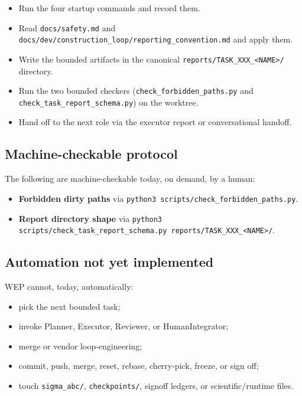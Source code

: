 \documentclass[11pt,a4paper]{article}
\begin{document}
\begin{itemize}[leftmargin=2em]
  \item Run the four startup commands and record them.
  \item Read \texttt{docs/safety.md} and
        \texttt{docs/dev/construction\_loop/reporting\_convention.md}
        and apply them.
  \item Write the bounded artifacts in the canonical
        \texttt{reports/TASK\_XXX\_<NAME>/} directory.
  \item Run the two bounded checkers
        (\texttt{check\_forbidden\_paths.py} and
        \texttt{check\_task\_report\_schema.py}) on the worktree.
  \item Hand off to the next role via the executor report or
        conversational handoff.
\end{itemize}

\subsection{Machine-checkable protocol}

The following are machine-checkable today, on demand, by a human:

\begin{itemize}[leftmargin=2em]
  \item \textbf{Forbidden dirty paths} via
        \texttt{python3 scripts/check\_forbidden\_paths.py}.
  \item \textbf{Report directory shape} via
        \texttt{python3 scripts/check\_task\_report\_schema.py
        reports/TASK\_XXX\_<NAME>/}.
\end{itemize}

\subsection{Automation not yet implemented}

WEP cannot, today, automatically:

\begin{itemize}[leftmargin=2em]
  \item pick the next bounded task;
  \item invoke Planner, Executor, Reviewer, or HumanIntegrator;
  \item merge or vendor loop-engineering;
  \item commit, push, merge, reset, rebase, cherry-pick, freeze,
        or sign off;
  \item touch \texttt{sigma\_abc/}, \texttt{checkpoints/}, signoff
        ledgers, or scientific/runtime files.
\end{itemize}
\end{document}
